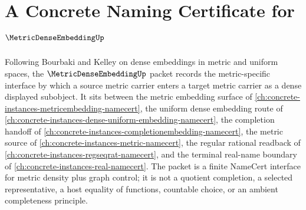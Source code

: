 \chapter{A Concrete Naming Certificate for $\MetricDenseEmbeddingUp$}
\label{ch:concrete-instances-metric-dense-embedding-namecert}

Following Bourbaki and Kelley on dense embeddings in metric and uniform spaces, the $\MetricDenseEmbeddingUp$ packet records the metric-specific interface by which a source metric carrier enters a target metric carrier as a dense displayed subobject. It sits between the metric embedding surface of \autoref{ch:concrete-instances-metricembedding-namecert}, the uniform dense embedding route of \autoref{ch:concrete-instances-dense-uniform-embedding-namecert}, the completion handoff of \autoref{ch:concrete-instances-completionembedding-namecert}, the metric source of \autoref{ch:concrete-instances-metric-namecert}, the regular rational readback of \autoref{ch:concrete-instances-regseqrat-namecert}, and the terminal real-name boundary of \autoref{ch:concrete-instances-real-namecert}. The packet is a finite NameCert interface for metric density plus graph control; it is not a quotient completion, a selected representative, a host equality of functions, countable choice, or an ambient completeness principle.

